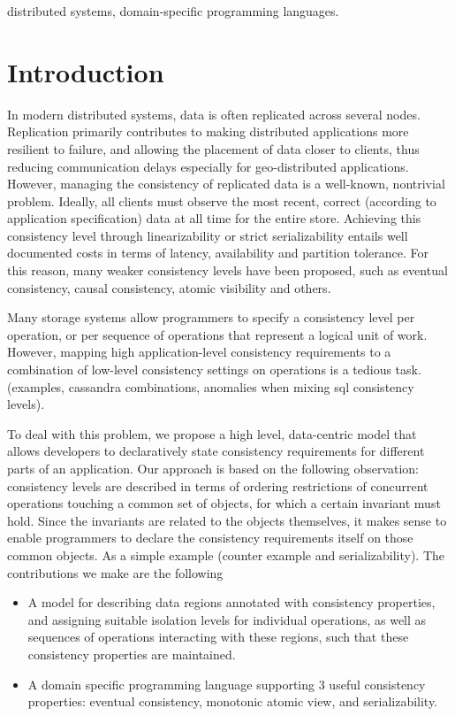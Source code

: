 \documentclass[preprint, numbers]{sigplanconf}
\begin{document}


\keywords
distributed systems, domain-specific programming languages.

\section{Introduction}
In modern distributed systems, data is often replicated 
across several nodes. Replication primarily contributes to making distributed 
applications more resilient to failure, and allowing the placement of data closer to clients, 
thus reducing communication delays especially for geo-distributed applications. 
However, managing the consistency of replicated data is a well-known, nontrivial
problem. Ideally, all clients must observe the most recent, correct (according to
application specification) data at all time for the entire store. Achieving this
consistency level through linearizability or strict serializability entails well
documented costs in terms of latency, availability and partition
tolerance. For this reason, many weaker consistency levels have been proposed,
such as eventual consistency, causal consistency, atomic visibility and others. 

Many storage systems allow programmers to specify a consistency level per
operation, or per sequence of operations that represent a logical unit of work.
However, mapping high application-level consistency requirements to  a combination of
low-level consistency settings on operations is a tedious task. (examples,
cassandra combinations, anomalies when mixing sql consistency levels).

To deal with this problem, we propose a high level, data-centric model that allows developers to declaratively state
consistency requirements for different parts of an application. Our approach is
based on  the following observation: consistency levels are described in terms
of ordering restrictions of concurrent operations touching a common set of objects, for which
a certain invariant must hold. Since the invariants are related to the objects
themselves, it makes sense to enable programmers to declare the consistency
requirements itself on those common objects. As a simple example (counter
example and serializability).
The contributions we make are the following 
\begin{itemize}
  \item A model for describing data regions annotated with consistency
    properties, and assigning suitable isolation levels for individual
    operations, as well as sequences of operations interacting with these
    regions, such that these consistency properties are maintained.
   
  \item A domain specific programming language supporting 3 useful consistency
    properties: eventual consistency, monotonic atomic view, and serializability.
\end{itemize}
\end{document}
